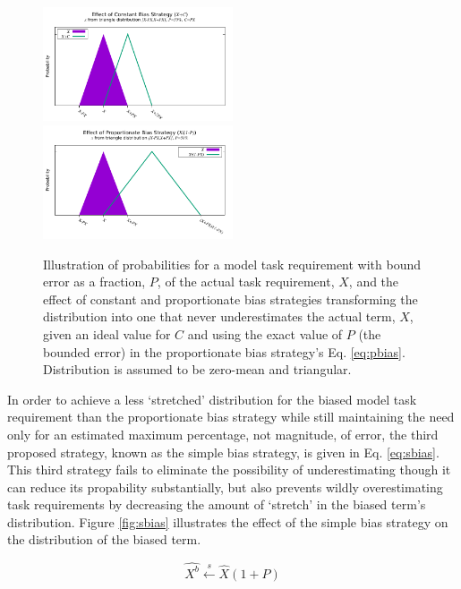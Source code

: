 \documentclass[10pt]{csce}
\begin{document}
\begin{figure}
	\begin{center}
		\includegraphics[width=0.5\textwidth]{figures/BiasVisualization_Constant.pdf}
		\includegraphics[width=0.5\textwidth]{figures/BiasVisualization_Proportionate.pdf}
	\end{center}
	\caption{Illustration of probabilities for a model task requirement
		with bound error as a fraction, $P$, of the actual task
		requirement, $X$, and the effect of constant and proportionate
		bias strategies transforming the distribution into
		one that never underestimates the actual term, $X$, given an
		ideal value for $C$ and using the exact value of $P$ (the bounded
		error) in the proportionate bias strategy's Eq. \ref{eq:pbias}.
		Distribution is assumed to be zero-mean and triangular.}
	\label{fig:cpbias}
\end{figure}

In order to achieve a less `stretched' distribution for the biased model task
requirement than the proportionate bias strategy while still maintaining the
need only for an estimated maximum percentage, not magnitude, of error, the
third proposed strategy, known as the simple bias strategy, is given in Eq.
\ref{eq:sbias}. This third strategy fails to eliminate the possibility of
underestimating though it can reduce its propability substantially, but also
prevents wildly overestimating task requirements by decreasing the amount of
`stretch' in the biased term's distribution.  Figure \ref{fig:sbias}
illustrates the effect of the simple bias strategy on the distribution of the
biased term.

\begin{equation}
\hat{X^b} \xleftarrow{s} \hat{X} (1 + P)
\label{eq:sbias}
\end{equation}
\end{document}

